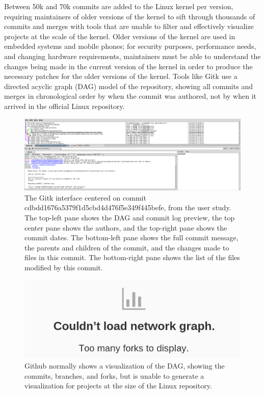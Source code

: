 
Between 50k and 70k commits are added to the Linux kernel per version,
requiring maintainers of older versions of the kernel to sift through
thousands of commits and merges with tools that are unable to filter and
effectively visualize projects at the scale of the kernel. Older
versions of the kernel are used in embedded systems and mobile phones;
for security purposes, performance needs, and changing hardware
requirements, maintainers must be able to understand the changes being
made in the current version of the kernel in order to produce the
necessary patches for the older versions of the kernel. Tools like Gitk
use a directed acyclic graph (DAG) model of the repository, showing all
commits and merges in chronological order by when the commit was
authored, not by when it arrived in the official Linux repository.

\begin{figure}
        \centering
        \includegraphics[width=0.97\linewidth]{figures/gitk.png}
        \caption{The Gitk interface centered on commit
          cdbdd1676a5379f1d5cbd4d476f5e349f445befe, \comB from the user
          study. The top-left pane shows the DAG and commit log preview,
          the top center pane shows the authors, and the top-right
          pane shows the commit dates. The bottom-left pane shows the
          full commit message, the parents and children of the commit,
          and the changes made to files in this commit. The bottom-right
          pane shows the list of the files modified by this commit.}
        \label{fig:gitk}
\end{figure}

\begin{figure}
        \centering
        \includegraphics[width=0.8\linewidth]{figures/github_viewer.png}
        \caption{Github normally shows a visualization of the DAG,
          showing the commits, branches, and forks, but is unable to
          generate a visualization for projects at the size of the Linux
          repository.}
        \label{fig:gitfail}
\end{figure}


